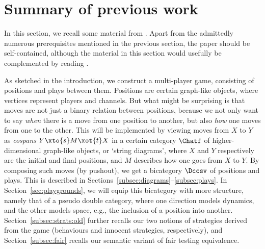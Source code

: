\documentclass{LMCS}
\theoremstyle{plain}\newtheorem{satz}[thm]{Satz}
\begin{document}
\section{Summary of previous work}\label{sec:HP}
In this section, we recall some material from . Apart from the
admittedly numerous prerequisites mentioned in the previous section,
the paper should be self-contained, although the material in this
section would usefully be complemented by reading . 

As sketched in the introduction, we construct a
multi-player game, consisting of positions and plays between
them. Positions are certain graph-like objects, where vertices
represent players and channels.  But what might be surprising is that
moves are not just a binary relation between positions, because we not
only want to say \emph{when} there is a move from one position to
another, but also \emph{how} one moves from one to the other. This
will be implemented by viewing moves from $X$ to $Y$ as \emph{cospans}
$Y \xto{s} M \xot{t} X$ in a certain category $\Chatf$ of
higher-dimensional graph-like objects, or `string diagrams', where $X$
and $Y$ respectively are the initial and final positions, and $M$
describes how one goes from $X$ to $Y$.  By composing such moves (by
pushout), we get a bicategory $\Dccsv$ of positions and plays. This is
described in Sections~\ref{subsec:diagrams}--\ref{subsec:plays}.  In
Section~\ref{sec:playgrounds}, we will equip this bicategory with more
structure, namely that of a pseudo double category, where one
direction models dynamics, and the other models space, e.g., the
inclusion of a position into another.  Section~\ref{subsec:strats:old}
further recalls our two notions of strategies derived from the game
(behaviours and innocent strategies, respectively), and
Section~\ref{subsec:fair} recalls our semantic variant of fair testing
equivalence.
\end{document}
